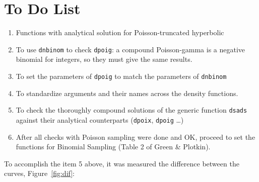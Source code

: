 \documentclass{article}
\newcommand{\code}[1]{\texttt{#1}}
\begin{document}
\section*{To Do List}

\begin{enumerate}
\item Functions with analytical solution for Poisson-truncated hyperbolic
\item To use \code{dnbinom} to check \code{dpoig}: a compound Poisson-gamma is a negative binomial for integers, so they must give the same results. 
\item To set the parameters of \code{dpoig} to match the parameters of \code{dnbinom}
\item To standardize arguments and their names across the density functions. 
\item To check the thoroughly compound solutions of the generic function \code{dsads} against their analytical counterparts (\code{dpoix}, \code{dpoig} \ldots)  
\item After all checks with Poisson sampling were done and OK, proceed to set the functions for Binomial Sampling (Table 2 of Green \& Plotkin).
\end{enumerate}

To accomplish the item 5 above, it was measured the difference between the curves, Figure~\ref{fig:dif}:



\end{document}
